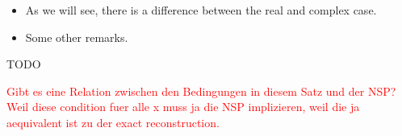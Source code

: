 \documentclass[11pt]{beamer}
\begin{document}
\begin{frame}


\begin{itemize}
	\item As we will see, there is a difference between the real and complex case.
	\item Some other remarks.
\end{itemize}

\end{frame}

\begin{frame}
	\begin{Satzz}
		{}{} TODO
	\end{Satzz}
	
	\textcolor{red}{Gibt es eine Relation zwischen den Bedingungen in diesem Satz und der NSP?  Weil diese condition fuer alle x muss ja die NSP implizieren, weil die ja aequivalent ist zu der exact reconstruction.}
\end{frame}
\end{document}
